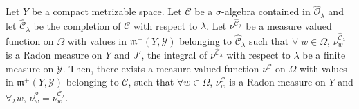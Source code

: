 \begin{lem}\label{part1:chap3:lem40}
Let $Y$ be a compact metrizable space. Let $\mathscr{C}$ be a
$\sigma$-algebra contained in $\hat{\mathscr{O}}_\lambda$ and let
$\hat{\mathscr{C}}_\lambda$ be the completion of $\mathscr{C}$ with
respect to $\lambda$. Let  $\nu^{\hat{\mathscr{C}}_\lambda}$ be a
measure valued function on $\Omega$ with values in $\mathfrak{m}^+ (Y,
\mathscr{Y})$ belonging to $\hat{\mathscr{C}}_\lambda$ such that
$\forall \; w \in \Omega$, $\nu_w^{\hat{\mathscr{C}}_\lambda}$ is a
Radon measure on $Y$ and $J'$, the integral of
$\nu^{\hat{\mathscr{C}}_\lambda}$ with respect to $\lambda$ be a
finite measure on $\mathscr{Y}$. Then, there exists a measure valued
function $\nu^\mathscr{C}$ on $\Omega$ with values in $\mathfrak{m}^+
(Y, \mathscr{Y})$ belonging to $\mathscr{C}$, such that $\forall w
\in\Omega$, $\nu^\mathscr{C}_w$ is a Radon measure on $Y$ and
$\forall_\lambda w$, $\nu^\mathscr{C}_w = \nu^{\hat{\mathscr{C}}_\lambda}_w$. 
\end{lem}

